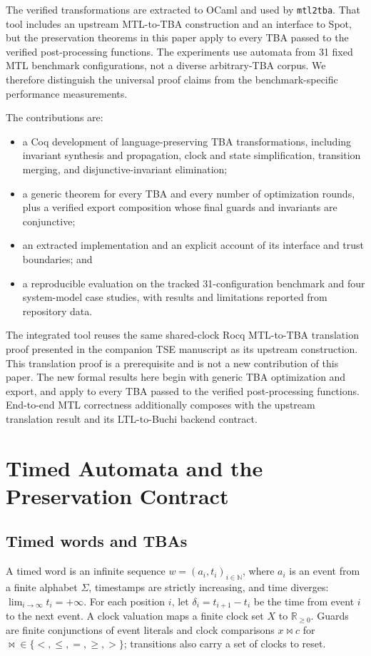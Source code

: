 \documentclass{ieeeaccess}
\providecommand{\Nat}{\mathbb{N}}
\providecommand{\Real}{\mathbb{R}}
\begin{document}
The verified transformations are extracted to OCaml and used by \texttt{mtl2tba}. That tool includes an upstream MTL-to-TBA construction and an interface to Spot, but the preservation theorems in this paper apply to every TBA passed to the verified post-processing functions. The experiments use automata from 31 fixed MTL benchmark configurations, not a diverse arbitrary-TBA corpus. We therefore distinguish the universal proof claims from the benchmark-specific performance measurements.

The contributions are:
\begin{itemize}[leftmargin=*]
  \item a Coq development of language-preserving TBA transformations, including invariant synthesis and propagation, clock and state simplification, transition merging, and disjunctive-invariant elimination;
  \item a generic theorem for every TBA and every number of optimization rounds, plus a verified export composition whose final guards and invariants are conjunctive;
  \item an extracted implementation and an explicit account of its interface and trust boundaries; and
  \item a reproducible evaluation on the tracked 31-configuration benchmark and four system-model case studies, with results and limitations reported from repository data.
\end{itemize}
The integrated tool reuses the same shared-clock Rocq MTL-to-TBA translation proof presented in the companion TSE manuscript as its upstream construction. This translation proof is a prerequisite and is not a new contribution of this paper. The new formal results here begin with generic TBA optimization and export, and apply to every TBA passed to the verified post-processing functions. End-to-end MTL correctness additionally composes with the upstream translation result and its LTL-to-Buchi backend contract.

\section{Timed Automata and the Preservation Contract}
\label{sec:model}
\subsection{Timed words and TBAs}
A timed word is an infinite sequence $w=(a_i,t_i)_{i\in\Nat}$, where $a_i$ is an event from a finite alphabet $\Sigma$, timestamps are strictly increasing, and time diverges: $\lim_{i\to\infty}t_i=+\infty$. For each position $i$, let $\delta_i=t_{i+1}-t_i$ be the time from event $i$ to the next event. A clock valuation maps a finite clock set $X$ to $\Real_{\ge0}$. Guards are finite conjunctions of event literals and clock comparisons $x\bowtie c$ for $\bowtie\in\{<,\le,=,\ge,>\}$; transitions also carry a set of clocks to reset.
\end{document}
